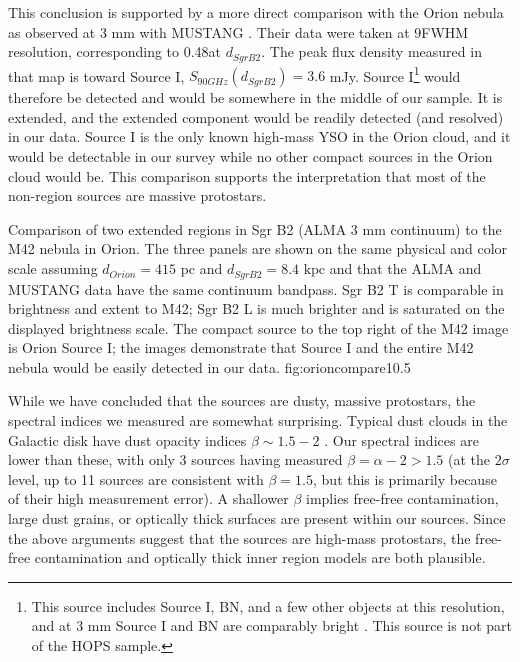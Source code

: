 \documentclass[twocolumn]{aastex61}
\newcommand{\dsgrb}{\ensuremath{8.4\textrm{~kpc}}\xspace}
\begin{document}
This conclusion is supported by a more direct comparison with the Orion nebula
as observed at 3 mm with MUSTANG \citep[][Figure
\ref{fig:orioncompare}]{Dicker2009a}.  Their data were taken at
9\arcsec FWHM resolution, corresponding to 0.48\arcsec at $d_{Sgr B2}$.  The
peak flux density measured in that map is toward Source I, $S_{90 GHz}(d_{Sgr
B2}) = 3.6$ mJy.  Source I\footnote{This source includes Source I, BN, and a few
other objects at this resolution, and at 3 mm Source I and BN are comparably
bright \citep{Plambeck2013a}.  This source is not part of the HOPS sample.}
would therefore  be detected and would be
somewhere in the middle of our sample.  It is  extended, and the
extended component would be readily detected (and resolved) in our data. 
Source I is the only known high-mass YSO in the Orion cloud, and it would
be detectable in our survey while no other compact sources in the Orion cloud
would be.  This comparison supports the interpretation that most of the
non-\hii region sources are massive protostars.


{Comparison of two extended \hii regions in Sgr B2 (ALMA 3 mm continuum) to the
M42 \citep[GBT MUSTANG 3 mm continuum;][]{Dicker2009a} nebula in Orion.
The three panels are shown on the same physical and color scale assuming
$d_{Orion} = 415$ pc and $d_{Sgr B2} = $\dsgrb and that the ALMA and MUSTANG
data have the same continuum bandpass.  Sgr B2 \hii T is comparable in
brightness and extent to M42; Sgr B2 \hii L is much brighter and is saturated
on the displayed brightness scale.  The compact source to the top right of the
M42 image is Orion Source I; the images demonstrate that Source I and the entire
M42 nebula would be easily detected in our data.
}
{fig:orioncompare}{1}{0.5\textwidth}

While we have concluded that the sources are dusty, massive protostars, the
spectral indices we measured are somewhat surprising.  Typical dust clouds in
the Galactic disk have dust opacity indices $\beta\sim1.5-2$
\citep{Schnee2010a,Shirley2011a,Sadavoy2016a}.  Our spectral indices are lower
than these, with only 3 sources having measured $\beta=\alpha-2 > 1.5$ (at the
$2\sigma$ level, up to 11 sources are consistent with $\beta=1.5$, but this is
primarily because of their high measurement error).  A shallower $\beta$
implies free-free contamination, large dust grains, or optically thick surfaces
are present within our sources.  Since the above arguments suggest that the
sources are high-mass protostars, the free-free contamination and optically
thick inner region models are both plausible.
\end{document}

